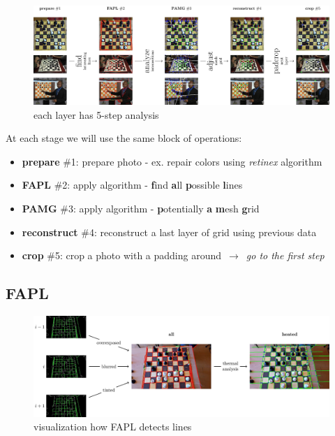 \documentclass[letterpaper, 12pt]{article}
\begin{document}
\begin{figure}[H]
\centering
\includegraphics[width=\columnwidth]{figure3}
\caption{each layer has 5-step analysis}
\end{figure}

At each stage we will use the same block of operations:

\begin{itemize}

\item\textbf{prepare} \#1: prepare photo - ex. repair colors using
\textit{retinex} algorithm

\item\textbf{FAPL} \#2: apply algorithm - \textbf{f}ind \textbf{a}ll
\textbf{p}ossible \textbf{l}ines

\item\textbf{PAMG} \#3: apply algorithm - \textbf{p}otentially \textbf{a}
\textbf{m}esh \textbf{g}rid

\item\textbf{reconstruct} \#4: reconstruct a last layer of grid using previous data

\item\textbf{crop} \#5: crop a photo with a padding around $\,\to\,$ \textit{go to the first step}

\end{itemize}

\subsection{FAPL}

\begin{figure}[H]
\centering
\includegraphics[width=\columnwidth]{figure4}
\caption{visualization how FAPL detects lines}
\end{figure}
\end{document}
